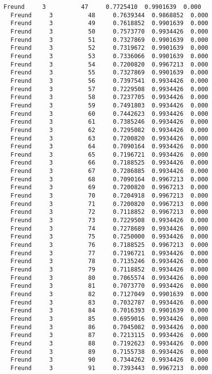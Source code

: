 \documentclass[11pt]{article}
\begin{document}
\begin{Verbatim}[commandchars=\\\{\}]
  Freund     3          47     0.7725410  0.9901639  0.000
  Freund     3          48     0.7639344  0.9868852  0.000
  Freund     3          49     0.7618852  0.9901639  0.000
  Freund     3          50     0.7573770  0.9934426  0.000
  Freund     3          51     0.7327869  0.9901639  0.000
  Freund     3          52     0.7319672  0.9901639  0.000
  Freund     3          53     0.7336066  0.9901639  0.000
  Freund     3          54     0.7200820  0.9967213  0.000
  Freund     3          55     0.7327869  0.9901639  0.000
  Freund     3          56     0.7397541  0.9934426  0.000
  Freund     3          57     0.7229508  0.9934426  0.000
  Freund     3          58     0.7237705  0.9934426  0.000
  Freund     3          59     0.7491803  0.9934426  0.000
  Freund     3          60     0.7442623  0.9934426  0.000
  Freund     3          61     0.7385246  0.9934426  0.000
  Freund     3          62     0.7295082  0.9934426  0.000
  Freund     3          63     0.7200820  0.9934426  0.000
  Freund     3          64     0.7090164  0.9934426  0.000
  Freund     3          65     0.7196721  0.9934426  0.000
  Freund     3          66     0.7188525  0.9934426  0.000
  Freund     3          67     0.7286885  0.9934426  0.000
  Freund     3          68     0.7090164  0.9967213  0.000
  Freund     3          69     0.7200820  0.9967213  0.000
  Freund     3          70     0.7204918  0.9967213  0.000
  Freund     3          71     0.7200820  0.9967213  0.000
  Freund     3          72     0.7118852  0.9967213  0.000
  Freund     3          73     0.7229508  0.9934426  0.000
  Freund     3          74     0.7278689  0.9934426  0.000
  Freund     3          75     0.7250000  0.9934426  0.000
  Freund     3          76     0.7188525  0.9967213  0.000
  Freund     3          77     0.7196721  0.9934426  0.000
  Freund     3          78     0.7135246  0.9934426  0.000
  Freund     3          79     0.7118852  0.9934426  0.000
  Freund     3          80     0.7065574  0.9934426  0.000
  Freund     3          81     0.7073770  0.9934426  0.000
  Freund     3          82     0.7127049  0.9901639  0.000
  Freund     3          83     0.7032787  0.9934426  0.000
  Freund     3          84     0.7016393  0.9901639  0.000
  Freund     3          85     0.6959016  0.9934426  0.000
  Freund     3          86     0.7045082  0.9934426  0.000
  Freund     3          87     0.7213115  0.9934426  0.000
  Freund     3          88     0.7192623  0.9934426  0.000
  Freund     3          89     0.7155738  0.9934426  0.000
  Freund     3          90     0.7344262  0.9934426  0.000
  Freund     3          91     0.7393443  0.9967213  0.000

\end{Verbatim}
\end{document}
